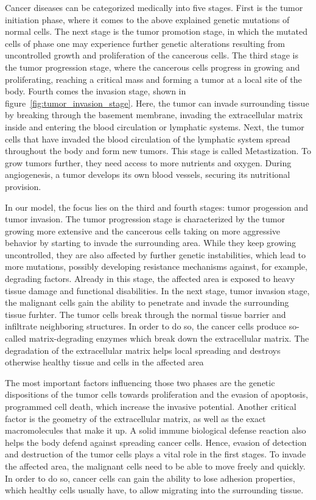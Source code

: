 Cancer diseases can be categorized medically into five stages. First is the tumor initiation phase, where it comes to the above explained genetic mutations of normal cells. The next stage is the tumor promotion stage, in which the mutated cells of phase one may experience further genetic alterations resulting from uncontrolled growth and proliferation of the cancerous cells. The third stage is the tumor progression stage, where the cancerous cells progress in growing and proliferating, reaching a critical mass and forming a tumor at a local site of the body. Fourth comes the invasion stage, shown in figure~\ref{fig:tumor_invasion_stage}. Here, the tumor can invade surrounding tissue by breaking through the basement membrane, invading the extracellular matrix inside and entering the blood circulation or lymphatic systems. Next, the tumor cells that have invaded the blood circulation of the lymphatic system spread throughout the body and form new tumors. This stage is called Metastization. To grow tumors further, they need access to more nutrients and oxygen. During angiogenesis, a tumor develops its own blood vessels, securing its nutritional provision.

In our model, the focus lies on the third and fourth stages: tumor progession and tumor invasion. The tumor progression stage is characterized by the tumor growing more extensive and the cancerous cells taking on more aggressive behavior by starting to invade the surrounding area. While they keep growing uncontrolled, they are also affected by further genetic instabilities, which lead to more mutations, possibly developing resistance mechanisms against, for example, degrading factors. Already in this stage, the affected area is exposed to heavy tissue damage and functional disabilities. In the next stage, tumor invasion stage, the malignant cells gain the ability to penetrate and invade the surrounding tissue furhter. The tumor cells break through the normal tissue barrier and infiltrate neighboring structures. In order to do so, the cancer cells produce so-called matrix-degrading enzymes which break down the extracellular matrix. The degradation of the extracellular matrix helps local spreading and destroys otherwise healthy tissue and cells in the affected area

The most important factors influencing those two phases are the genetic dispositions of the tumor cells towards proliferation and the evasion of apoptosis, programmed cell death, which increase the invasive potential. Another critical factor is the geometry of the extracellular matrix, as well as the exact macromolecules that make it up. A solid immune biological defense reaction also helps the body defend against spreading cancer cells. Hence, evasion of detection and destruction of the tumor cells plays a vital role in the first stages. To invade the affected area, the malignant cells need to be able to move freely and quickly. In order to do so, cancer cells can gain the ability to lose adhesion properties, which healthy cells usually have, to allow migrating into the surrounding tissue.

